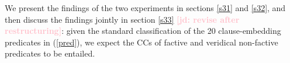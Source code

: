 \documentclass[11pt,fleqn]{article}
\newcommand{\jd}[1]{\textbf{\textcolor{Pink}{[jd: #1]}}}
\newcommand{\6}{\mbox{$[\hspace*{-.6mm}[$}}
\newcommand{\9}{\mbox{$]\hspace*{-.6mm}]$}}
\begin{document}
We present the findings of the two experiments in sections \ref{s31} and \ref{s32}, and then discuss the findings jointly in section \ref{s33} \jd{revise after restructuring}: given the standard classification of the 20 clause-embedding predicates in (\ref{pred}), we expect the CCs of factive and veridical non-factive predicates to be entailed.


%
%
%
\end{document}
